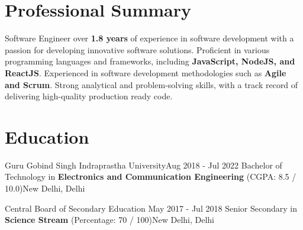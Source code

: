 \section{Professional Summary}
\resumeSubHeadingListStart
Software Engineer over \textbf{1.8 years} of experience in software development with a passion for developing innovative software solutions. Proficient in various programming languages and frameworks, including \textbf{JavaScript, NodeJS, and ReactJS}. Experienced in software development methodologies such as \textbf{Agile and Scrum}. Strong analytical and problem-solving skills, with a track record of delivering high-quality production ready code.
\resumeSubHeadingListEnd
\section{Education}
\resumeSubHeadingListStart
    \resumeSubheading
    {Guru Gobind Singh Indraprastha University}{Aug 2018 - Jul 2022}
    {Bachelor of Technology in \textbf{Electronics and Communication Engineering}  (CGPA: 8.5 / 10.0)}{New Delhi, Delhi}
    \resumeItemListStart
    \resumeItemListEnd
    
    \resumeSubheading
     {Central Board of Secondary Education }{May 2017 - Jul 2018}
    {Senior Secondary in \textbf{Science Stream}  (Percentage: 70 / 100)}{New Delhi, Delhi}
    \resumeItemListStart
     \resumeItemListEnd
    \resumeSubHeadingListEnd